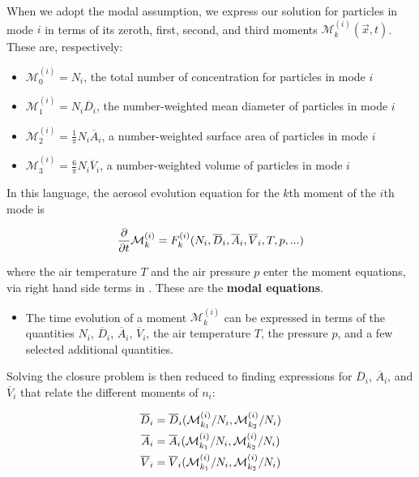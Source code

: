 When we adopt the modal assumption, we express our solution for particles in
mode $i$ in terms of its zeroth, first, second, and third moments
$\mathcal{M}_k^{(i)}(\vec{x}, t)$. These are, respectively:

\begin{itemize}
  \item $\mathcal{M}_0^{(i)} = N_i$, the total number of concentration for particles
        in mode $i$
  \item $\mathcal{M}_1^{(i)} = N_i\overline{D}_i$, the number-weighted mean diameter of
        particles in mode $i$
  \item $\mathcal{M}_2^{(i)} = \frac{1}{\pi}N_i\overline{A}_i$, a number-weighted
        surface area of particles in mode $i$
  \item $\mathcal{M}_3^{(i)} = \frac{6}{\pi}N_i\overline{V}_i$, a number-weighted
        volume of particles in mode $i$
\end{itemize}

In this language, the aerosol evolution equation for the $k$th moment of the
$i$th mode is

\begin{equation}\labeleq{modal_evolution}
  \ddt\mathcal{M}_k^{(i)} = F_k^{(i)}(N_i, \overline{D}_i, \overline{A}_i, \overline{V}_i, T, p, \mathsf{...})
\end{equation}

where the air temperature $T$ and the air pressure $p$ enter the moment
equations, via right hand side terms in . These are the
{\bf modal equations}.

\begin{itemize}
  \item \assume The time evolution of a moment $\mathcal{M}_k^{(i)}$ can be
    expressed in terms of the quantities $N_i$, $\overline{D}_i$,
    $\overline{A}_i$, $\overline{V}_i$, the air temperature $T$, the pressure $p$, and a few
    selected additional quantities.
\end{itemize}

Solving the closure problem is then reduced to finding expressions for
$\overline{D}_i$, $\overline{A}_i$, and $\overline{V}_i$ that relate the
different moments of $n_i$:

\begin{align}
  \overline{D}_i &= \overline{D}_i(\mathcal{M}_{k_1}^{(i)}/N_i, \mathcal{M}_{k_2}^{(i)}/N_i) \labeleq{D_i}\\
  \overline{A}_i &= \overline{A}_i(\mathcal{M}_{k_1}^{(i)}/N_i, \mathcal{M}_{k_2}^{(i)}/N_i) \labeleq{A_i}\\
  \overline{V}_i &= \overline{V}_i(\mathcal{M}_{k_1}^{(i)}/N_i, \mathcal{M}_{k_2}^{(i)}/N_i) \labeleq{V_i}
\end{align}

